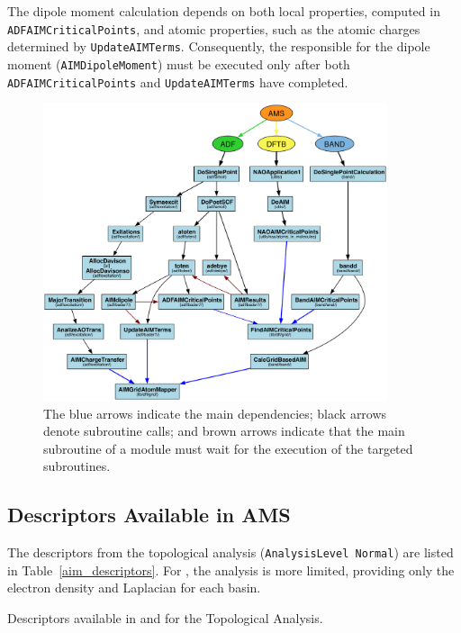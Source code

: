 The dipole moment calculation depends on both local properties, computed in
\texttt{ADFAIMCriticalPoints}, and atomic properties, such as the atomic
charges determined by \texttt{UpdateAIMTerms}. Consequently, the
\subroutine responsible for the dipole moment
(\texttt{AIMDipoleMoment}) must be executed only after both
\texttt{ADFAIMCriticalPoints} and \texttt{UpdateAIMTerms} have completed.

\newpage
\vspace*{4cm}
\begin{figure}[h]
  \centering
  \includegraphics[width=0.9\textwidth]{calls/ams.pdf}
  \caption{The blue arrows indicate the main dependencies; black arrows denote
           subroutine calls; and brown arrows indicate that the main
           subroutine of a module must wait for the execution of the targeted
           subroutines.}
  \label{ams_modules}
\end{figure}

\newpage
\subsection{Descriptors Available in AMS}

The descriptors from the topological analysis (\texttt{AnalysisLevel Normal})
are listed in Table~\ref{aim_descriptors}. For \band, the analysis is more
limited, providing only the electron density and Laplacian for each basin.

\begin{table}[h!]
  \caption{Descriptors available in \adf and \dftb for the Topological Analysis.}
  
  \label{aim_descriptors}
\end{table}

